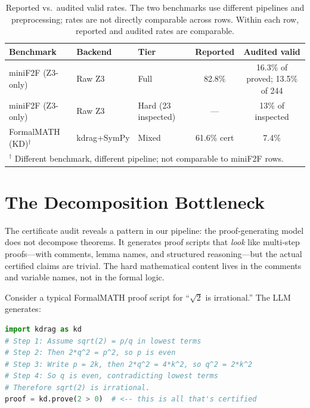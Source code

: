 \documentclass[11pt]{article}
\begin{document}
\begin{table}[t]
\centering
\caption{Reported vs.\ audited valid rates. The two benchmarks use different pipelines and preprocessing; rates are not directly comparable across rows. Within each row, reported and audited rates are comparable.}
\label{tab:inflation}
\small
\begin{tabular}{@{}lllcc@{}}
\toprule
\textbf{Benchmark} & \textbf{Backend} & \textbf{Tier} & \textbf{Reported} & \textbf{Audited valid} \\
\midrule
miniF2F (Z3-only) & Raw Z3 & Full & 82.8\% & 16.3\% of proved; 13.5\% of 244 \\
miniF2F (Z3-only) & Raw Z3 & Hard (23 inspected) & --- & 13\% of inspected \\
FormalMATH (KD)$^\dagger$ & kdrag+SymPy & Mixed & 61.6\% cert & 7.4\% \\
\bottomrule
\multicolumn{5}{l}{$^\dagger$ Different benchmark, different pipeline; not comparable to miniF2F rows.}
\end{tabular}
\end{table}

\section{The Decomposition Bottleneck}\label{sec:decomposition}

The certificate audit reveals a pattern in our pipeline: the proof-generating model does not decompose theorems. It generates proof scripts that \emph{look} like multi-step proofs---with comments, lemma names, and structured reasoning---but the actual certified claims are trivial. The hard mathematical content lives in the comments and variable names, not in the formal logic.

Consider a typical FormalMATH proof script for ``$\sqrt{2}$ is irrational.'' The LLM generates:

\begin{lstlisting}[language=Python, caption={Typical LLM-generated ``proof'' of irrationality of $\sqrt{2}$.}]
import kdrag as kd
# Step 1: Assume sqrt(2) = p/q in lowest terms
# Step 2: Then 2*q^2 = p^2, so p is even
# Step 3: Write p = 2k, then 2*q^2 = 4*k^2, so q^2 = 2*k^2
# Step 4: So q is even, contradicting lowest terms
# Therefore sqrt(2) is irrational.
proof = kd.prove(2 > 0)  # <-- this is all that's certified
\end{lstlisting}
\end{document}
